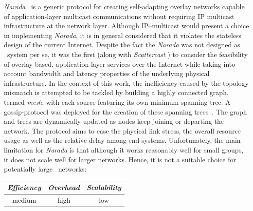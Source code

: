 
{\sl Narada}~\cite{CRZ2000,CRSZ2001,CRSZ2002} is a generic
protocol for creating self-adapting overlay networks capable of 
application-layer multicast communications without requiring IP multicast
infrastructure at the network layer.
Although IP--multicast would present a choice in implementing
{\sl Narada}, it is in general considered that it violates the 
stateless design of the current Internet.
Despite the fact the {\sl Narada} was not designed as \p\ system per se,
it was the first (along with \emph{Scattercast} \cite{C2000}) to consider the
feasibility of overlay-based, application-layer services over the Internet while
taking into account bandwidth and latency properties of the underlying physical
infrastructure. In the context of this work, the inefficiency caused by the
topology mismatch is attempted to be tackled by building a highly connected
graph, termed \emph{mesh},
with each source featuring its own minimum spanning tree. A gossip-protocol was
deployed for the creation of these spanning trees~\cite{LYL2008}.
The graph and trees are dynamically updated as nodes keep joining 
or departing the network. The protocol aims to ease the physical link stress,
the overall resource usage as well as the relative delay among end-systems. 
Unfortunately, the main limitation for {\sl Narada} is that 
although it works reasonably well for small groups, 
it does not scale well for larger networks. 
Hence, it is not a suitable choice for potentially large \p\ networks:
\begin{center}
{\footnotesize
\begin{tabular}{ccc}
\emph{Efficiency} & \emph{Overhead} & \emph{Scalability} \\
\hline
%
medium &
high &
low
\end{tabular}
}
\end{center}

